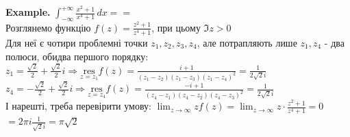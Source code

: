 \documentclass[a4paper, 14pt]{extarticle}
\def\residue#1#2{\underset{z = {#1}}{\textrm{res}} {#2}}
\def\hugespace{\vspace{5mm} \\}
\begin{document}
\textbf{Example.} $\displaystyle \int_{-\infty}^{+\infty} \frac{x^2+1}{x^4+1}\,dx = \boxed{=}$\\
Розглянемо функцію $\displaystyle f(z) = \frac{z^2+1}{z^4+1}$, при цьому $\Im z > 0$\\
Для неї є чотири проблемні точки $z_1, z_2, z_3, z_4$, але потрапляють лише $z_1, z_4$ - два полюси, обидва першого порядку:\\
$\displaystyle z_1 = \frac{\sqrt{2}}{2} + \frac{\sqrt{2}}{2} i \Rightarrow \residue{z_1}{f(z)} = \frac{i+1}{(z_1-z_2)(z_1-z_3)(z_1-z_4)^2} = \frac{1}{2 \sqrt{2} i}$\\
$\displaystyle z_4 = -\frac{\sqrt{2}}{2} + \frac{\sqrt{2}}{2} i \Rightarrow \residue{z_4}{f(z)} = \frac{-i+1}{(z_4-z_1)(z_4-z_2)(z_4-z_3)^2} = \frac{1}{2 \sqrt{2} i}$\\
І нарешті, треба перевірити умову: $\displaystyle \lim_{z \to \infty} z f(z) = \lim_{z \to \infty} z \cdot \frac{z^2+1}{z^4+1} = 0$\\
$\displaystyle \boxed{=} 2 \pi i \frac{1}{\sqrt{2} i } = \pi \sqrt{2}$
\hugespace
\end{document}
